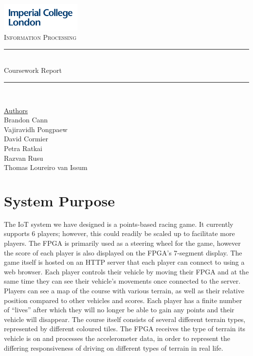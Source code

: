 \documentclass[12pt,a4paper]{article}
\begin{document}
\begin{titlepage}
	\newcommand{\HRule}{\rule{\linewidth}{0.5mm}}
    \includegraphics[width = 4cm]{./Images/Logo.jpg}\\[0.5cm] 
    
    \center 
	\textsc{\large Information Processing }\\[0.3cm] 
    
	\HRule \\[0.3cm]
	Coursework Report
    \HRule \\[0.7cm]
     
    \begin{center}
		\underline{Authors}\\[0.1cm] Brandon Cann\\[0.1cm]
        Vajiravidh Pongpaew\\[0.1cm]
        David Cormier\\[0.1cm]
        Petra Ratkai\\[0.1cm]
		Razvan Rusu\\[0.1cm]
		Thomas Loureiro van Issum \\[0.7cm]
	\end{center} \large

    \tableofcontents

    \vfill %
\end{titlepage}

\section{\small System Purpose}

{\scriptsize The IoT system we have designed is a points-based racing game. 
It currently supports 6 players; however, this could readily be 
scaled up to facilitate more players. The FPGA is primarily used 
as a steering wheel for the game, however the score of each player 
is also displayed on the FPGA’s 7-segment display. The game itself 
is hosted on an HTTP server that each player can connect to using a 
web browser. Each player controls their vehicle by moving their FPGA 
and at the same time they can see their vehicle’s movements once 
connected to the server. Players can see a map of the course with 
various terrain, as well as their relative position compared to 
other vehicles and scores. Each player has a finite number of “lives” 
after which they will no longer be able to gain any points and their 
vehicle will disappear. The course itself consists of several different 
terrain types, represented by different coloured tiles. The FPGA 
receives the type of terrain its vehicle is on and processes the 
accelerometer data, in order to represent the differing responsiveness 
of driving on different types of terrain in real life. }
\end{document}
